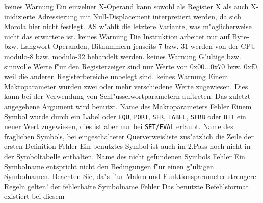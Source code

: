 \documentclass[12pt,a4paper,twoside]{report}
\newcommand{\tty}[1]{{\tt #1}}
\begin{document}
{\begin{description}
               {keines}
               {Warnung}
               {Ein einzelner X-Operand kann sowohl als Register X als
                auch X-inidizierte Adressierung mit Null-Displacement
                interpretiert werden, da sich Morola hier nicht festlegt.
                AS w"ahlt die letztere Variante, was m"oglicherweise nicht
                das erwartete ist.}
               {keines}
               {Warnung}
               {Die Instruktion arbeitet nur auf Byte- bzw.
                Langwort-Operanden, Bitnummern jenseits 7 bzw. 31 werden
                von der CPU modulo-8 bzw. modulo-32 behandelt werden.}
               {keines}
               {Warnung}
               {G"ultige bzw. sinnvolle Werte f"ur den Registerzeiger sind
                nur Werte von 0x00...0x70 bzw. 0xf0, weil die anderen
                Registerbereiche unbelegt sind.}
               {keines}
               {Warnung}
               {Einem Makroparameter wurden zwei oder mehr
                verschiedene Werte zugewiesen.  Dies kann bei der
                Verwendung von Schl"usselwortparametern auftreten.
                Das zuletzt angegebene Argument wird benutzt.}
               {Name des Makroparameters}
               {Fehler}
               {Einem Symbol wurde durch ein Label oder
	        \tty{EQU}, \tty{PORT}, \tty{SFR}, \tty{LABEL},
	        \tty{SFRB} oder \tty{BIT} ein neuer  Wert zugewiesen, dies
                ist aber nur bei \tty{SET/EVAL} erlaubt.}
               {Name des fraglichen Symbols, bei eingeschalteter
	        Querverweisliste zus"atzlich die Zeile der ersten Definition}
               {Fehler}
               {Ein benutztes Symbol ist auch im 2.Pass noch
                nicht in der Symboltabelle enthalten.}
               {Name des nicht gefundenen Symbols}
               {Fehler}
               {Ein Symbolname entspricht nicht den Bedingungen
                f"ur einen g"ultigen Symbolnamen.  Beachten Sie, da"s f"ur
                Makro-und Funktionsparameter strengere Regeln gelten!}
               {der fehlerhafte Symbolname}
               {Fehler}
               {Das benutzte Befehlsformat existiert bei diesem
}
\end{description}}
\end{document}
